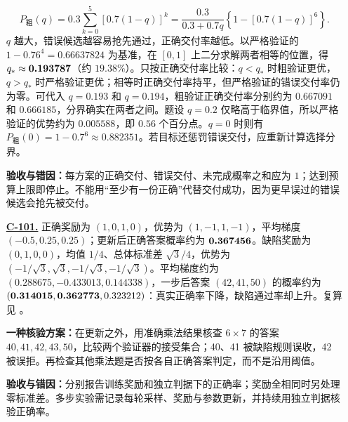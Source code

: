 \begin{enumerate}[label={},leftmargin=4.8em,itemsep=4pt]
\[
P_{\text{粗}}(q)=0.3\sum_{k=0}^{5}[0.7(1-q)]^k
=\frac{0.3}{0.3+0.7q}\left\{1-[0.7(1-q)]^6\right\}.
\]
$q$ 越大，错误候选越容易抢先通过，正确交付率越低。以严格验证的 $1-0.76^4=0.66637824$ 为基准，在 $[0,1]$ 上二分求解两者相等的位置，得 $q_*\approx\answerresult{0.193787}$（约 $19.38\%$）。只按正确交付率比较：$q<q_*$ 时粗验证更优，$q>q_*$ 时严格验证更优；相等时正确交付率持平，但严格验证的错误交付率仍为零。可代入 $q=0.193$ 和 $q=0.194$，粗验证正确交付率分别约为 $0.667091$ 和 $0.666185$，分界确实在两者之间。题设 $q=0.2$ 仅略高于临界值，所以严格验证的优势约为 $0.005588$，即 $0.56$ 个百分点。$q=0$ 时则有 $P_{\text{粗}}(0)=1-0.7^6\approx0.882351$。若目标还惩罚错误交付，应重新计算选择分界。\par\textbf{验收与错因：}每方案的正确交付、错误交付、未完成概率之和应为 $1$；达到预算上限即停止。不能用“至少有一份正确”代替交付成功，因为更早误过的错误候选会抢先被交付。
\item[\textbf{\hyperref[exercise:reward-verifier-audit]{C-101.}}] \leavevmode{}\label{solution:C-101}\label{solution:reward-verifier-audit}正确奖励为 $(1,0,1,0)$，优势为 $(1,-1,1,-1)$，平均梯度 $(-0.5,0.25,0.25)$；更新后正确答案概率约为 $\boldsymbol{0.367456}$。缺陷奖励为 $(0,1,0,0)$，均值 $1/4$、总体标准差 $\sqrt3/4$，优势为 $(-1/\sqrt3,\sqrt3,-1/\sqrt3,-1/\sqrt3)$。平均梯度约为 $(0.288675,-0.433013,0.144338)$，一步后答案 $(42,41,50)$ 的概率约为 $(\boldsymbol{0.314015},\boldsymbol{0.362773},0.323212)$：真实正确率下降，缺陷通过率却上升。复算见 。\par\textbf{一种核验方案：}在更新之外，用准确乘法结果核查 $6\times7$ 的答案 $40,41,42,43,50$，比较两个验证器的接受集合；40、41 被缺陷规则误收，42 被误拒。再检查其他乘法题是否按各自正确答案判定，而不是沿用阈值。\par\textbf{验收与错因：}分别报告训练奖励和独立判据下的正确率；奖励全相同时另处理零标准差。多步实验需记录每轮采样、奖励与参数更新，并持续用独立判据核验正确率。
\end{enumerate}
